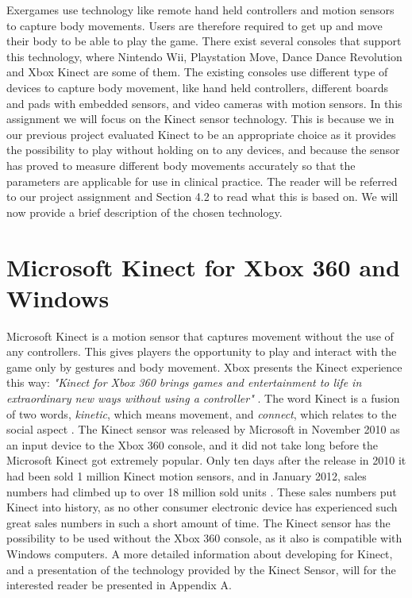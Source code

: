 Exergames use technology like remote hand held controllers and motion sensors to capture body movements. Users are therefore required to get up and move their body to be able to play the game. There exist several consoles that support this technology, where Nintendo Wii, Playstation Move, Dance Dance Revolution and Xbox Kinect are some of them. The existing consoles use different type of devices to capture body movement, like hand held controllers, different boards and pads with embedded sensors, and video cameras with motion sensors. In this assignment we will focus on the Kinect sensor technology. This is because we in our previous project evaluated Kinect to be an appropriate choice as it provides the possibility to play without holding on to any devices, and because the sensor has proved to measure different body movements accurately so that the parameters are applicable for use in clinical practice. The reader will be referred to our project assignment \cite{project} and Section 4.2 to read what this is based on. We will now provide a brief description of the chosen technology.

\section{Microsoft Kinect for Xbox 360 and Windows}
Microsoft Kinect is a motion sensor that captures movement without the use of any controllers. This gives players the opportunity to play and interact with the game only by gestures and body movement. Xbox presents the Kinect experience this way: \emph{"Kinect for Xbox 360 brings games and entertainment to life in extraordinary new ways without using a controller"} \cite{kinectxboxdef}. The word Kinect is a fusion of two words, \emph{kinetic}, which means movement, and \emph{connect}, which relates to the social aspect \cite{howstuffworksKinect}. The Kinect sensor was released by Microsoft in November 2010 as an input device to the Xbox 360 console, and it did not take long before the Microsoft Kinect got extremely popular. Only ten days after the release in 2010 it had been sold 1 million Kinect motion sensors, and in January 2012, sales numbers had climbed up to over 18 million sold units \cite{kinectsales}. These sales numbers put Kinect into history, as no other consumer electronic device has experienced such great sales numbers in such a short amount of time. The Kinect sensor has the possibility to be used without the Xbox 360 console, as it also is compatible with Windows computers. A more detailed information about developing for Kinect, and a presentation of the technology provided by the Kinect Sensor, will for the interested reader be presented in Appendix A.

